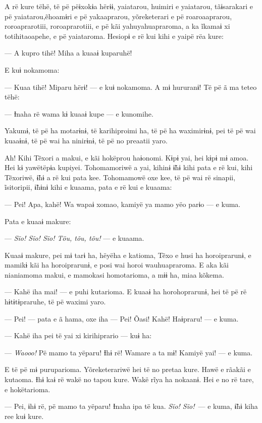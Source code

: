 A rë kure tëhë, të pë pëɨxokɨa hërɨɨ, yaiatarou, huimiri e yaiatarou,
tãɨsarakari e pë yaiatarou,ẽhoamɨri e pë yakaaprarou, yõreketerari e pë
roaroaaprarou, roroaprarotiii, roroaprarotiii, e pë kãi
yahuyahuapraroma, a ka ĩkamaɨ xi totihitaoapehe, e pë yaiataroma.
Hesiopɨ e rë kui kihi e yaipë rëa kure: 

--- A kupro tihë! Miha a kuaaɨ kuparuhë! 

E kuɨ nokamoma: 

--- Kuaa tihë! Miparu hërɨ! --- e kuɨ nokamoma. A mɨ hururanɨ! Të pë ã
ma teteo tëhë:

--- Ɨnaha rë wama kɨ kuaaɨ kupe --- e kunomihe. 

Yakumɨ, të pë ha motarɨnɨ, të karihiproimi ha, të pë ha waximirɨnɨ, pei
të pë wai kuaaɨnɨ, të pë wai ha ninirɨnɨ, të pë no preaatii yaro. 

Ah! Kihi Tẽxori a makui, e kãi hokëprou haɨonomi. Kɨpɨ yai, hei kɨpɨ mɨ
amoa. Hei kɨ yawëtëpɨa kupiyei. Tohomamoriwë a yai, kihinɨ ɨ̃hɨ kihi pata
e rë kui, kihi Tẽxoriwë, ɨ̃hɨ a rë kui pata kee. Tohomamowë oxe kee, të
pë wai rë sinapii, ĩsitoripii, ɨ̃hɨnɨ kihi e kuaama, pata e rë kui e
kuaama: 

--- Pei! Apa, kahë! Wa wapaɨ xomao, kamiyë ya mamo yëo parɨo --- e
kuma. 

Pata e kuaaɨ makure:

--- \textit{Sĩo! Sĩo! Sĩo! Tõu, tõu, tõu!} --- e kuaama. 

Kuaaɨ makure, pei mɨ tarɨ ha, hëyëha e katioma, Tẽxo e husi ha
horoiprarunɨ, e mamikɨ kãi ha horoiprarunɨ, e posi wai horoi
wauhuapraroma. E aka kãi nianiamoma makui, e mamokasi homotarioma, a mɨɨ
ha, miaa kõkema. 

--- Kahë iha mai! --- e puhi kutarioma. E kuaaɨ ha horohoprarunɨ, hei të
pë rë hɨtɨtɨpraruhe, të pë waximi yaro. 

--- Pei! --- pata e ã hama, oxe iha --- Pei! Õasi! Kahë! Haɨpraru! --- e
kuma. 

--- Kahë iha pei të yai xi kirihiprario --- kuɨ ha: 

--- \textit{Waooo!} Pë mamo ta yëparu! Ɨhɨ rë! Wamare a ta mɨ! Kamiyë yai! --- e
kuma. 

E të pë mɨ puruparioma. Yõreketerariwë hei të no pretaa kure. Hawë e
rãakãi e kutaoma. Ɨhɨ kaɨ rë wakë no tapou kure. Wakë rĩya ha nokaanɨ.
Hei e no rë tare, e hokëtarioma. 

--- Pei, ɨhɨ rë, pë mamo ta yëparu! Ɨnaha ipa të kua. \textit{Sĩo! Sĩo!}~--- e
kuma, ɨ̃hɨ kiha ree kuɨ kure. 

